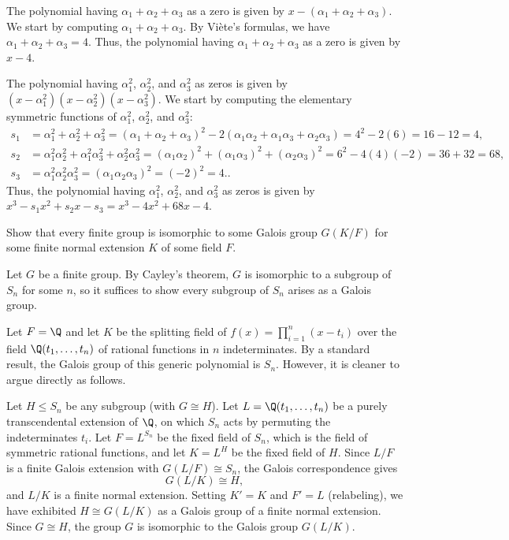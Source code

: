 \begin{solution}[(i)]
  The polynomial having $\alpha_1 + \alpha_2 + \alpha_3$ as a zero is given by $x - (\alpha_1 + \alpha_2 + \alpha_3)$. We start by computing $\alpha_1 + \alpha_2 + \alpha_3$. By Viète's formulas, we have $\alpha_1 + \alpha_2 + \alpha_3 = 4$. Thus, the polynomial having $\alpha_1 + \alpha_2 + \alpha_3$ as a zero is given by $x - 4$.
\end{solution}

\begin{solution}[(ii)]
  The polynomial having $\alpha_1^2$, $\alpha_2^2$, and $\alpha_3^2$ as zeros is given by $(x - \alpha_1^2)(x - \alpha_2^2)(x - \alpha_3^2)$. We start by computing the elementary symmetric functions of $\alpha_1^2$, $\alpha_2^2$, and $\alpha_3^2$:
  \begin{align*}
    s_1 &= \alpha_1^2 + \alpha_2^2 + \alpha_3^2 = (\alpha_1 + \alpha_2 + \alpha_3)^2 - 2(\alpha_1\alpha_2 + \alpha_1\alpha_3 + \alpha_2\alpha_3) = 4^2 - 2(6) = 16 - 12 = 4, \\
    s_2 &= \alpha_1^2\alpha_2^2 + \alpha_1^2\alpha_3^2 + \alpha_2^2\alpha_3^2 = (\alpha_1\alpha_2)^2 + (\alpha_1\alpha_3)^2 + (\alpha_2\alpha_3)^2 = 6^2 - 4(4)(-2) = 36 + 32 = 68, \\
    s_3 &= \alpha_1^2\alpha_2^2\alpha_3^2 = (\alpha_1\alpha_2\alpha_3)^2 = (-2)^2 = 4.
  .\end{align*}
  Thus, the polynomial having $\alpha_1^2$, $\alpha_2^2$, and $\alpha_3^2$ as zeros is given by $x^3 - s_1x^2 + s_2x - s_3 = x^3 - 4x^2 + 68x - 4$.
\end{solution}

\begin{problem}[47.11]
  Show that every finite group is isomorphic to some Galois group $G(K/F)$ for some finite normal extension $K$ of some field $F$.
\end{problem}

\begin{solution}
  Let $G$ be a finite group. By Cayley's theorem, $G$ is isomorphic to a subgroup of $S_n$ for some $n$, so it suffices to show every subgroup of $S_n$ arises as a Galois group.

  Let $F = \Q$ and let $K$ be the splitting field of $f(x) = \prod_{i=1}^n (x - t_i)$ over the field $\Q(t_1, \ldots, t_n)$ of rational functions in $n$ indeterminates. By a standard result, the Galois group of this generic polynomial is $S_n$. However, it is cleaner to argue directly as follows.

  Let $H \le S_n$ be any subgroup (with $G \cong H$). Let $L = \Q(t_1, \ldots, t_n)$ be a purely transcendental extension of $\Q$, on which $S_n$ acts by permuting the indeterminates $t_i$. Let $F = L^{S_n}$ be the fixed field of $S_n$, which is the field of symmetric rational functions, and let $K = L^H$ be the fixed field of $H$. Since $L/F$ is a finite Galois extension with $G(L/F) \cong S_n$, the Galois correspondence gives
  \[%
    G(L/K) \cong H
  ,\]%
  and $L/K$ is a finite normal extension. Setting $K' = K$ and $F' = L$ (relabeling), we have exhibited $H \cong G(L/K)$ as a Galois group of a finite normal extension. Since $G \cong H$, the group $G$ is isomorphic to the Galois group $G(L/K)$.
\end{solution}

